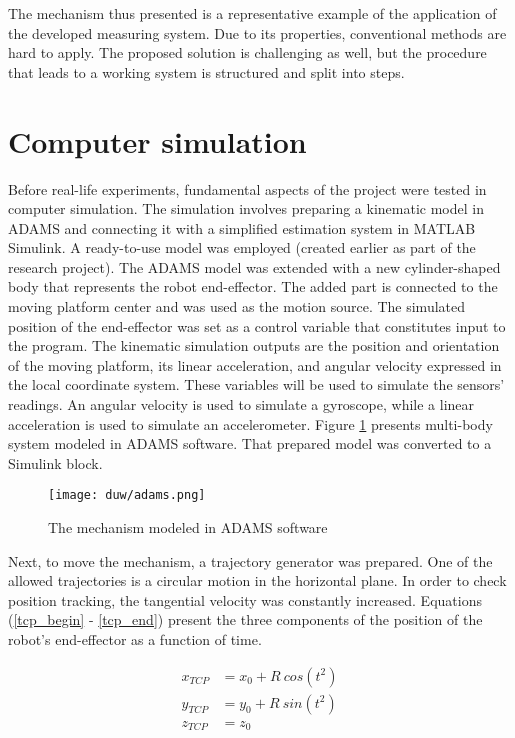 The mechanism thus presented is a representative example of the application of the developed measuring system. Due to its properties, conventional methods are hard to apply. The proposed solution is challenging as well, but the procedure that leads to a working system is structured and split into steps. 

\section{Computer simulation}

Before real-life experiments, fundamental aspects of the project were tested in computer simulation. The simulation involves preparing a kinematic model in ADAMS and connecting it with a simplified estimation system in MATLAB Simulink. A ready-to-use model was employed (created earlier as part of the research project). The ADAMS model was extended with a new cylinder-shaped body that represents the robot end-effector. The added part is connected to the moving platform center and was used as the motion source. The simulated position of the end-effector was set as a control variable that constitutes input to the program. The kinematic simulation outputs are the position and orientation of the moving platform, its linear acceleration, and angular velocity expressed in the local coordinate system. These variables will be used to simulate the sensors' readings. An angular velocity is used to simulate a gyroscope, while a linear acceleration is used to simulate an accelerometer. Figure \ref{adams} presents multi-body system modeled in ADAMS software. That prepared model was converted to a Simulink block.

\begin{figure}[!h]
	\centering
	\texttt{[image: duw/adams.png]}
	\caption{The mechanism modeled in ADAMS software}
	\label{adams}
\end{figure}

Next, to move the mechanism, a trajectory generator was prepared. One of the allowed trajectories is a circular motion in the horizontal plane. In order to check position tracking, the tangential velocity was constantly increased. Equations (\ref{tcp_begin} - \ref{tcp_end}) present the three components of the position of the robot's end-effector as a function of time.

\begin{align}
	x_{TCP} &= x_0 +  R\ cos( t^2 )
	\label{tcp_begin}\\
	y_{TCP} &= y_0  + R\ sin( t^2 )\\
	z_{TCP} &= z_0
	\label{tcp_end}
\end{align}


